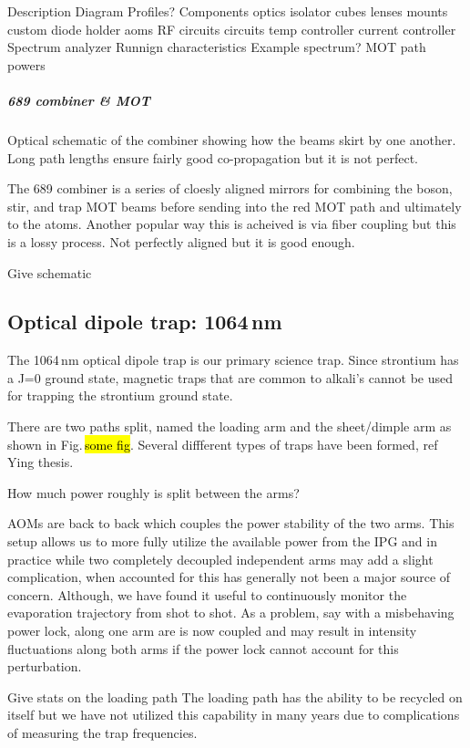 Description
Diagram
	Profiles?
Components
	optics
		isolator
		cubes
		lenses
	mounts
		custom diode holder
	aoms
		RF circuits
	circuits
		temp controller
		current controller
	Spectrum analyzer
Runnign characteristics
	Example spectrum?
	MOT path powers
	
\subparagraph{689 combiner \& MOT}
Optical schematic of the combiner showing how the beams skirt by one another.
Long path lengths ensure fairly good co-propagation but it is not perfect.

The 689 combiner is a series of cloesly aligned mirrors for combining the boson, stir, and trap MOT beams before sending into the red MOT path and ultimately to the atoms.
Another popular way this is acheived is via fiber coupling but this is a lossy process.
Not perfectly aligned but it is good enough.

Give schematic
\pagebreak


\subsection{Optical dipole trap: 1064\,nm} \label{ssec:1064sys}
The 1064\,nm optical dipole trap is our primary science trap.
Since strontium has a J=0 ground state, magnetic traps that are common to alkali's cannot be used for trapping the strontium ground state.

There are two paths split, named the loading arm and the sheet/dimple arm as shown in Fig.\,\hl{some fig}.
Several diffferent types of traps have been formed, ref Ying thesis. 

How much power roughly is split between the arms?

AOMs are back to back which couples the power stability of the two arms. 
This setup allows us to more fully utilize the available power from the IPG and in practice while two completely decoupled independent arms may add a slight complication, when accounted for this has generally not been a major source of concern. 
Although, we have found it useful to continuously monitor the evaporation trajectory from shot to shot. 
As a problem, say with a misbehaving power lock, along one arm are is now coupled and may result in intensity fluctuations along both arms if the power lock cannot account for this perturbation.

Give stats on the loading path The loading path has the ability to be recycled on itself but we have not utilized this capability in many years due to complications of measuring the trap frequencies. 

